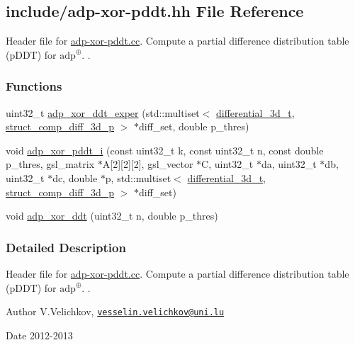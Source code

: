 \hypertarget{adp-xor-pddt_8hh}{\subsection{include/adp-\/xor-\/pddt.hh \-File \-Reference}
\label{adp-xor-pddt_8hh}
}


\-Header file for \hyperlink{adp-xor-pddt_8cc}{adp-\/xor-\/pddt.\-cc}. \-Compute a partial difference distribution table (p\-D\-D\-T) for $\mathrm{adp}^{\oplus}$. .  


\subsubsection*{\-Functions}
\begin{DoxyCompactItemize}
\item 
uint32\-\_\-t \hyperlink{adp-xor-pddt_8hh_ae336b477810714f22775c1c36449c3a8}{adp\-\_\-xor\-\_\-ddt\-\_\-exper} (std\-::multiset$<$ \hyperlink{structdifferential__3d__t}{differential\-\_\-3d\-\_\-t}, \hyperlink{structstruct__comp__diff__3d__p}{struct\-\_\-comp\-\_\-diff\-\_\-3d\-\_\-p} $>$ $\ast$diff\-\_\-set, double p\-\_\-thres)
\item 
void \hyperlink{adp-xor-pddt_8hh_a390612775ec87908fbb044d375ff9010}{adp\-\_\-xor\-\_\-pddt\-\_\-i} (const uint32\-\_\-t k, const uint32\-\_\-t n, const double p\-\_\-thres, gsl\-\_\-matrix $\ast$\-A\mbox{[}2\mbox{]}\mbox{[}2\mbox{]}\mbox{[}2\mbox{]}, gsl\-\_\-vector $\ast$\-C, uint32\-\_\-t $\ast$da, uint32\-\_\-t $\ast$db, uint32\-\_\-t $\ast$dc, double $\ast$p, std\-::multiset$<$ \hyperlink{structdifferential__3d__t}{differential\-\_\-3d\-\_\-t}, \hyperlink{structstruct__comp__diff__3d__p}{struct\-\_\-comp\-\_\-diff\-\_\-3d\-\_\-p} $>$ $\ast$diff\-\_\-set)
\item 
void \hyperlink{adp-xor-pddt_8hh_a2a98c59498fcf33df1976b272cf5809e}{adp\-\_\-xor\-\_\-ddt} (uint32\-\_\-t n, double p\-\_\-thres)
\end{DoxyCompactItemize}


\subsubsection{\-Detailed \-Description}
\-Header file for \hyperlink{adp-xor-pddt_8cc}{adp-\/xor-\/pddt.\-cc}. \-Compute a partial difference distribution table (p\-D\-D\-T) for $\mathrm{adp}^{\oplus}$. . \begin{DoxyAuthor}{\-Author}
\-V.\-Velichkov, \href{mailto:vesselin.velichkov@uni.lu}{\tt vesselin.\-velichkov@uni.\-lu} 
\end{DoxyAuthor}
\begin{DoxyDate}{\-Date}
2012-\/2013 
\end{DoxyDate}


